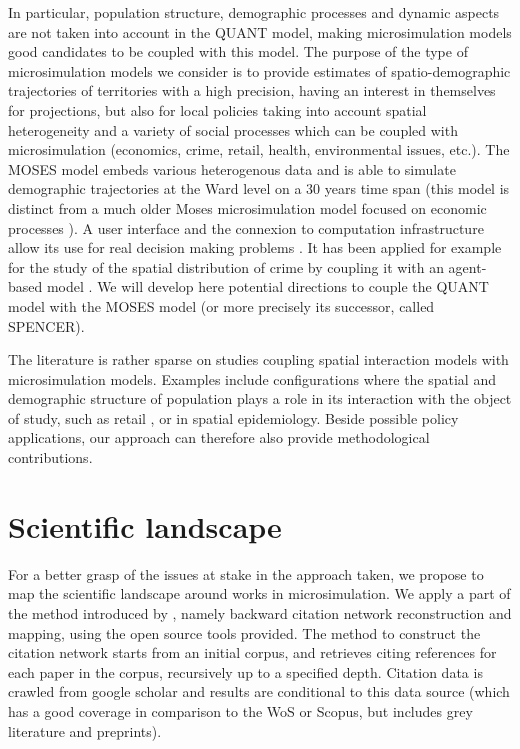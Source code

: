 In particular, population structure, demographic processes and dynamic aspects are not taken into account in the QUANT model, making microsimulation models \cite{birkin2011spatial} good candidates to be coupled with this model. The purpose of the type of microsimulation models we consider is to provide estimates of spatio-demographic trajectories of territories with a high precision, having an interest in themselves for projections, but also for local policies taking into account spatial heterogeneity and a variety of social processes which can be coupled with microsimulation (economics, crime, retail, health, environmental issues, etc.). The MOSES model embeds various heterogenous data and is able to simulate demographic trajectories at the Ward level on a 30 years time span \cite{townend2009moses,Wu2013} (this model is distinct from a much older Moses microsimulation model focused on economic processes \cite{eliasson1989moses}). A user interface and the connexion to computation infrastructure allow its use for real decision making problems \cite{birkin2009moses}. It has been applied for example for the study of the spatial distribution of crime by coupling it with an agent-based model \cite{malleson2012analysis}. We will develop here potential directions to couple the QUANT model with the MOSES model (or more precisely its successor, called SPENCER).

The literature is rather sparse on studies coupling spatial interaction models with microsimulation models. Examples include configurations where the spatial and demographic structure of population plays a role in its interaction with the object of study, such as retail \cite{Nakaya2007}, or in spatial epidemiology. Beside possible policy applications, our approach can therefore also provide methodological contributions.





\section{Scientific landscape}

For a better grasp of the issues at stake in the approach taken, we propose to map the scientific landscape around works in microsimulation. We apply a part of the method introduced by \cite{raimbault2017exploration}, namely backward citation network reconstruction and mapping, using the open source tools provided. The method to construct the citation network starts from an initial corpus, and retrieves citing references for each paper in the corpus, recursively up to a specified depth. Citation data is crawled from google scholar and results are conditional to this data source (which has a good coverage in comparison to the WoS or Scopus, but includes grey literature and preprints).

